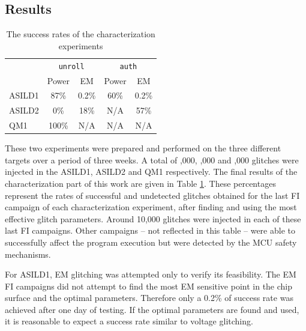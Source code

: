 \documentclass[10pt, conference, compsocconf]{IEEEtran}
\newcommand{\TI}{ASILD1\xspace}
\newcommand{\ST}{ASILD2\xspace}
\newcommand{\NXP}{QM1\xspace}
\newcommand{\unroll}{\texttt{unroll}\xspace}
\newcommand{\auth}{\texttt{auth}\xspace}
\begin{document}
\subsection{Results}
\begin{table}[!t]
\caption{The success rates of the characterization experiments} 
\label{tab:char-experiments}
\centering
\begin{tabular}{l cc cc}
\toprule
         & \multicolumn{2}{c}{\unroll}  
         & \multicolumn{2}{c}{\auth}       \\
           
           \cmidrule(lr){2-3}  \cmidrule(lr){4-5}        
         
         & \multicolumn{1}{c}{Power}                        & \multicolumn{1}{c}{EM}  
         & \multicolumn{1}{c}{Power}                        & \multicolumn{1}{c}{EM}                              
               \\
        \cmidrule(lr){1-5}
\TI      & 87\%   
         & 0.2\%      
         & 60\%   
         & 0.2\%      
         \\
\ST 
         & 0\%                  
         & 18\%                
         & N/A      
         & 57\%                 
         \\
\NXP 
         & 100\%                  
         & N/A               
         & N/A      
         & N/A                 
         \\
\bottomrule
\end{tabular}
\end{table}
These two experiments were prepared and performed on the three different targets over a period of three weeks. A total of ,000, ,000 and ,000 glitches were injected in the \TI, \ST and \NXP respectively. The final results of the characterization part of this work are given in Table \ref{tab:char-experiments}. These percentages represent the rates of successful and undetected glitches obtained for the last FI campaign of each characterization experiment, after finding and using the most effective glitch parameters. Around 10,000 glitches were injected in each of these last FI campaigns. Other campaigns -- not reflected in this table -- were able to successfully affect   the program execution but were detected by the MCU safety mechanisms.   

For \TI, EM glitching was attempted only to verify its feasibility. The EM FI campaigns did not attempt to find the most EM sensitive point in the chip surface and the optimal parameters. Therefore only a 0.2\% of success rate was achieved after one day of testing. If the optimal parameters are found and used, it is reasonable to expect a success rate similar to voltage glitching.
\end{document}
